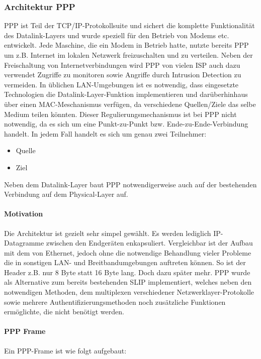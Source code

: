 \subsubsection{Architektur PPP}\label{subsubsection:architecture_ppp}
\ac{PPP} ist Teil der TCP/IP-Protokollsuite und sichert die komplette Funktionalität des
Datalink-Layers und wurde speziell für den Betrieb von Modems etc. entwickelt.
Jede Maschine, die ein Modem in Betrieb hatte, nutzte bereits \ac{PPP} um z.B.
Internet im lokalen Netzwerk freizuschalten und zu verteilen.
Neben der Freischaltung von Internetverbindungen wird \ac{PPP} von vielen \ac{ISP}
auch dazu verwendet Zugriffe zu monitoren sowie Angriffe durch Intrusion Detection zu vermeiden.
In üblichen \ac{LAN}-Umgebungen ist es notwendig, dass eingesetzte Technologien die Datalink-Layer-Funktion
implementieren und darüberhinhaus über einen MAC-Meschanismus verfügen, da verschiedene
Quellen/Ziele das selbe Medium teilen könnten. Dieser Regulierungsmechanismus ist bei \ac{PPP}
nicht notwendig, da es sich um eine Punkt-zu-Punkt bzw. Ende-zu-Ende-Verbindung handelt.
In jedem Fall handelt es sich um genau zwei Teilnehmer:
\begin{itemize}
	\item Quelle
	\item Ziel
\end{itemize}

Neben dem Datalink-Layer baut \ac{PPP} notwendigerweise auch auf der bestehenden Verbindung
auf dem Physical-Layer auf.

\paragraph{Motivation} Die Architektur ist gezielt sehr simpel gewählt. Es werden lediglich IP-Datagramme zwischen den
Endgeräten enkapsuliert. Vergleichbar ist der Aufbau mit dem von Ethernet, jedoch ohne
die notwendige Behandlung vieler Probleme die in sonstigen \ac{LAN}- und Breitbandumgebungen
auftreten können. So ist der Header z.B. nur 8 Byte statt 16 Byte lang. Doch dazu später mehr.
\ac{PPP} wurde als Alternative zum bereits bestehenden \ac{SLIP} implementiert, welches neben den notwendigen
Methoden, dem multiplexen verschiedener Netzwerklayer-Protokolle sowie mehrere Authentifizierungsmethoden noch zusätzliche Funktionen ermöglichte, die nicht benötigt werden.

\paragraph{PPP Frame}
Ein \ac{PPP}-Frame ist wie folgt aufgebaut:

